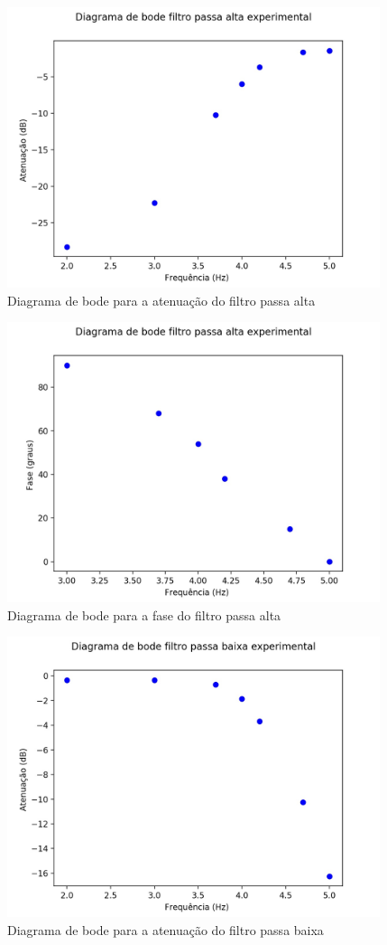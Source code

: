 \documentclass{article}
\begin{document}
\begin{figure}[h!]
\centering
\includegraphics[height=8.2cm]{images/passa_alta_ate_exp.jpg}
\caption{Diagrama de bode para a atenuação do filtro passa alta}
\label{fig:passa_alta_atenuacao}
\end{figure}

\begin{figure}[h!]
\centering
\includegraphics[height=8.2cm]{images/passa_alta_fase_exp.jpg}
\caption{Diagrama de bode para a fase do filtro passa alta}
\label{fig:passa_alta_fase}
\end{figure}

\begin{figure}[h!]
\centering
\includegraphics[height=8.2cm]{images/passa_baixa_ate_exp.jpg}
\caption{Diagrama de bode para a atenuação do filtro passa baixa}
\label{fig:passa_baixa_atenuacao}
\end{figure}
\end{document}
